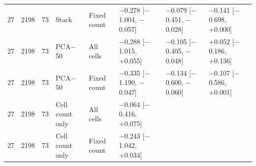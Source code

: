 \begin{tabular}{llllllll}
27 & 2198 & 73 & Stack & Fixed count & $-$0.278 [$-$1.004, $-$0.057] & $-$0.079 [$-$0.451, $-$0.028] & $-$0.141 [$-$0.698, +0.000] \\
27 & 2198 & 73 & PCA$-$50 & All cells & $-$0.288 [$-$1.015, +0.055] & $-$0.105 [$-$0.405, $-$0.048] & +0.052 [$-$0.186, +0.136] \\
27 & 2198 & 73 & PCA$-$50 & Fixed count & $-$0.335 [$-$1.190, $-$0.047] & $-$0.134 [$-$0.600, $-$0.060] & $-$0.107 [$-$0.586, +0.001] \\
27 & 2198 & 73 & Cell count only & All cells & $-$0.064 [$-$0.416, +0.075] &  &  \\
27 & 2198 & 73 & Cell count only & Fixed count & $-$0.243 [$-$1.042, +0.034] &  &  \\
\bottomrule
\end{tabular}
